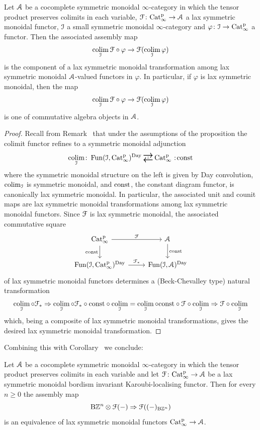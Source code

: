 \begin{proposition}
Let $\mathcal{A}$ be a cocomplete symmetric monoidal $\infty$-category in which the tensor product preserves colimits in each variable, $\mathcal{F}\colon \mathrm{Cat}^{\mathrm p}_\infty \to \mathcal{A}$ a lax symmetric monoidal functor, $\mathcal{I}$ a small symmetric monoidal $\infty$-category and $\varphi \colon \mathcal{I} \to \mathrm{Cat}^{\mathrm p}_\infty$ a functor. Then the associated assembly map
\[
\mathop{\mathrm{colim}}_{\mathcal{I}} \mathcal{F}\circ \varphi \to \mathcal{F}(\mathop{\mathrm{colim}}_{\mathcal{I}} \varphi)
\]
is the component of a lax symmetric monoidal transformation among lax symmetric monoidal $\mathcal{A}$-valued functors in $\varphi$. In particular, if $\varphi$ is lax symmetric monoidal, then the map 
\[
\mathop{\mathrm{colim}}_{\mathcal{I}} \mathcal{F}\circ \varphi \to \mathcal{F}(\mathop{\mathrm{colim}}_{\mathcal{I}} \varphi)
\]
is one of commutative algebra objects in $\mathcal{A}$.
\end{proposition}
\begin{proof}
Recall from Remark~ that under the assumptions of the proposition the colimit functor refines to a symmetric monoidal adjunction
\[
\colim_\I \colon \Fun(\I,\Catp)^{\Day} \adj \Catp \cocolon \const
\]
where the symmetric monoidal structure on the left is given by Day convolution, %
$\mathop{\mathrm{colim}}_{\mathcal{I}}$ is symmetric monoidal, %
and $\mathrm{const}$, the constant diagram functor, is canonically lax symmetric monoidal. In particular, the associated unit and counit maps are lax symmetric monoidal transformations among lax symmetric monoidal functors.
Since $\mathcal{F}$ is lax symmetric monoidal,
the associated commutative square 
\[
\begin{tikzcd}
\Catp \ar[r,"\F"]\ar[d,"\const"'] & \A \ar[d,"\const"] \\
\Fun(\I,\Catp)^{\Day} \ar[r,"\F_*"] & \Fun(\I,\A)^{\Day}
\end{tikzcd}
\]
of lax symmetric monoidal functors determines a (Beck-Chevalley type) natural transformation
\[
\mathop{\mathrm{colim}}_{\mathcal{I}} \circ \mathcal{F}_* \Rightarrow \mathop{\mathrm{colim}}_{\mathcal{I}} \circ\mathcal{F}_*\circ \mathrm{const}\circ\mathop{\mathrm{colim}}_{\mathcal{I}} = \mathop{\mathrm{colim}}_{\mathcal{I}}\circ \mathrm{const}\circ \mathcal{F} \circ\mathop{\mathrm{colim}}_{\mathcal{I}} \Rightarrow \mathcal{F}\circ\mathop{\mathrm{colim}}_{\mathcal{I}}
\]
which, being a composite of lax symmetric monoidal transformations, gives the desired lax symmetric monoidal transformation.
\end{proof}


Combining this with Corollary~ we conclude:
\begin{corollary}
\label{corollary:iteratedassmonoidal}%
Let $\mathcal{A}$ be a cocomplete symmetric monoidal $\infty$-category in which the tensor product preserves colimits in each variable and let $\mathcal{F}\colon \mathrm{Cat}^{\mathrm p}_\infty \to \mathcal{A}$ be a lax symmetric monoidal bordism invariant Karoubi-localising functor. %
Then for every $n \geq 0$ the assembly map
\[
\mathrm{B}\mathbb{Z}^n \otimes \mathcal{F}(-) \Rightarrow \mathcal{F}((-)_{\mathrm{B}\mathbb{Z}^n})
\]
is an equivalence of lax symmetric monoidal functors $\mathrm{Cat}^{\mathrm p}_\infty \to \mathcal{A}$. %
\end{corollary}


